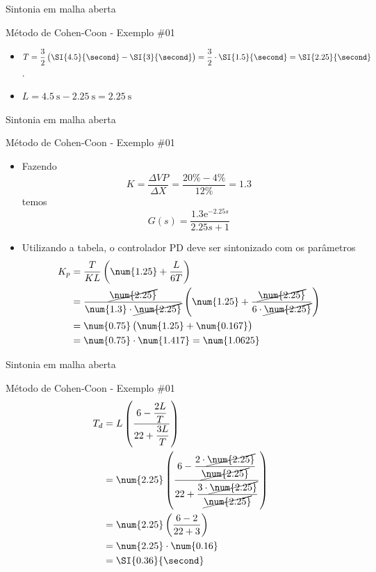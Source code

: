 \begin{frame}{Sintonia em malha aberta}
	\begin{block}{Método de Cohen-Coon - Exemplo \#01}
		\begin{itemize}
			\item $ T=\dfrac{3}{2}\del{\SI{4.5}{\second}-\SI{3}{\second}}=\dfrac{3}{2}\cdot\SI{1.5}{\second}=\SI{2.25}{\second} $.
			\item $ L=\SI{4.5}{\second}-\SI{2.25}{\second}=\SI{2.25}{\second} $
		\end{itemize}
	\end{block}
	
	\centering
	\scalebox{1.4}{}
\end{frame}


\begin{frame}{Sintonia em malha aberta}
	\begin{block}{Método de Cohen-Coon - Exemplo \#01}
		\begin{itemize}
			\item Fazendo
			\[ K=\dfrac{\Delta VP}{\Delta X}=\dfrac{20\%-4\%}{12\%}=\num{1.3} \]
			temos
			\[ G(s)=\dfrac{\num{1.3}\text{e}^{-\num{2.25}s}}{\num{2.25}s+1} \]
			\item Utilizando a tabela, o controlador PD deve ser sintonizado com os parâmetros
			\begin{align*}
				K_p	&=\dfrac{T}{KL}\del{\num{1.25}+\dfrac{L}{6T}}\\
					&=\dfrac{\cancel{\num{2.25}}}{\num{1.3}\cdot\cancel{\num{2.25}}}\del{\num{1.25}+\dfrac{\cancel{\num{2.25}}}{6\cdot\cancel{\num{2.25}}}}\\
					&=\num{0.75}\del{\num{1.25}+\num{0.167}}\\
					&=\num{0.75}\cdot\num{1.417}=\num{1.0625}
			\end{align*}
		\end{itemize}
	\end{block}
\end{frame}


\begin{frame}{Sintonia em malha aberta}
	\begin{block}{Método de Cohen-Coon - Exemplo \#01}
		\begin{align*}
		T_d	&=L\del{\dfrac{6-\dfrac{2L}{T}}{22+\dfrac{3L}{T}}}\\
		&=\num{2.25}\del{\dfrac{6-\dfrac{2\cdot\cancel{\num{2.25}}}{\cancel{\num{2.25}}}}{22+\dfrac{3\cdot\cancel{\num{2.25}}}{\cancel{\num{2.25}}}}}\\
		&=\num{2.25}\del{\dfrac{6-2}{22+3}}\\
		&=\num{2.25}\cdot\num{0.16}\\
		&=\SI{0.36}{\second}
		\end{align*}
	\end{block}
\end{frame}


